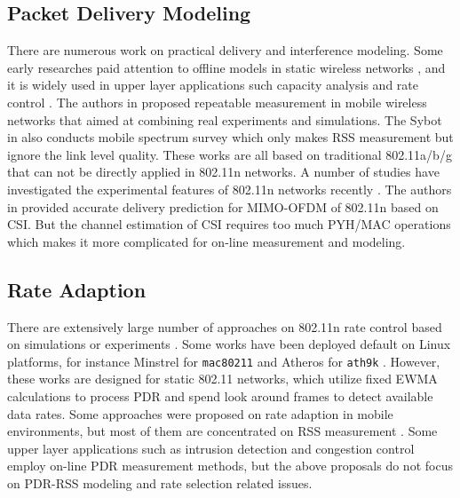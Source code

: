 \documentclass[draftclsnofoot,journal,onecolumn,11pt]{IEEEtran}
\begin{document}
\subsection{Packet Delivery Modeling}
There are numerous work on practical delivery and interference modeling. Some early researches paid attention to offline models in static wireless networks \cite{kolar2011mesh} \cite{reis2006model}, and it is widely used in upper layer applications such capacity analysis \cite{kashyap2007capacity} and rate control \cite{chen2011ram} \cite{judd2008efficient}. The authors in \cite{10.1109/TMC.2009.87} proposed repeatable measurement in mobile wireless networks that aimed at combining real experiments and simulations. The Sybot in \cite{kim2010sybot} also conducts mobile spectrum survey which only makes RSS measurement but ignore the link level quality. These works are all based on traditional 802.11a/b/g that can not be directly applied in 802.11n networks. A number of studies have investigated the experimental features of 802.11n networks recently \cite{Halperin2010predictable} \cite{k.rayanchu:fluid:}. The authors in \cite{Halperin2010predictable} provided accurate delivery prediction for MIMO-OFDM of 802.11n based on CSI. But the channel estimation of CSI \cite{CSI-SF} requires too much PYH/MAC operations which makes it more complicated for on-line measurement and modeling.

\subsection{Rate Adaption}
There are extensively large number of approaches on 802.11n rate control based on simulations or experiments \cite{kim2009experimental} \cite{Pefkianakis:2010} \cite{zhang2008practical}. Some works have been deployed default on Linux platforms, for instance Minstrel \cite{minstrel} for \texttt{mac80211} and Atheros for \texttt{ath9k} \cite{wong2008wireless}. However, these works are designed for static 802.11 networks, which utilize fixed EWMA calculations to process PDR and spend look around frames to detect available data rates. Some approaches were proposed on rate adaption in mobile environments, but most of them are concentrated on RSS measurement \cite{chen2011ram} \cite{judd2008efficient}. Some upper layer applications such as intrusion detection \cite{5620919} and congestion control \cite{floyd2000equation} employ on-line PDR measurement methods, but the above proposals do not focus on PDR-RSS modeling and rate selection related issues.
\end{document}
